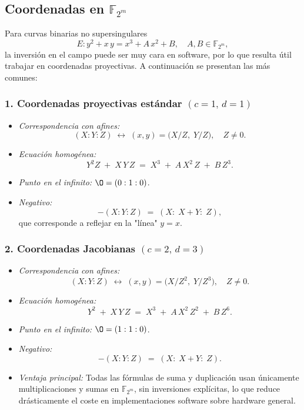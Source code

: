 \subsection{Coordenadas en \(\mathbb{F}_{2^m}\)}\label{sec:proj_F2m}
Para curvas binarias no supersingulares
\[
  E\colon y^2 + x\,y = x^3 + A\,x^2 + B,\quad A,B\in\mathbb{F}_{2^m},
\]
la inversión en el campo puede ser muy cara en software, por lo que resulta útil trabajar en coordenadas proyectivas. A continuación se presentan las más comunes:

\subsubsection*{1. Coordenadas proyectivas estándar \((c=1,\,d=1)\)}

\begin{itemize}
  \item \emph{Correspondencia con afines:}
  \[
    (X:Y:Z)\;\longleftrightarrow\;(x,y)=\bigl(X/Z,\;Y/Z\bigr),\quad Z\neq0.
  \]
  \item \emph{Ecuación homogénea:}
  \[
    Y^2Z \;+\; X\,Y\,Z \;=\; X^3 \;+\; A\,X^2\,Z \;+\; B\,Z^3.
  \]
  \item \emph{Punto en el infinito:} \(\O = (0:1:0)\).  
  \item \emph{Negativo:} 
  \[
    -(X:Y:Z) \;=\; (X:\;X+Y:\;Z),
  \]
  que corresponde a reflejar en la "línea" \(y = x\).
\end{itemize}

\subsubsection*{2. Coordenadas Jacobianas \((c=2,\,d=3)\)}

\begin{itemize}
  \item \emph{Correspondencia con afines:}
  \[
    (X:Y:Z)\;\longleftrightarrow\;(x,y)=\bigl(X/Z^2,\;Y/Z^3\bigr),\quad Z\neq0.
  \]
  \item \emph{Ecuación homogénea:}
  \[
    Y^2 \;+\; X\,Y\,Z \;=\; X^3 \;+\; A\,X^2\,Z^2 \;+\; B\,Z^6.
  \]
  \item \emph{Punto en el infinito:} \(\O = (1:1:0)\).  
  \item \emph{Negativo:} 
  \[
    -(X:Y:Z) \;=\; (X:\;X+Y:\;Z).
  \]
  \item \emph{Ventaja principal:} Todas las fórmulas de suma y duplicación usan únicamente multiplicaciones y sumas en \(\mathbb{F}_{2^m}\), sin inversiones explícitas, lo que reduce drásticamente el coste en implementaciones software sobre hardware general.
\end{itemize}

